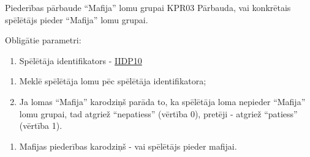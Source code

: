 \procedureTable
{Piederības pārbaude ``Mafija'' lomu grupai}
{KPR03}
{
	Pārbauda, vai konkrētais spēlētājs pieder ``Mafija'' lomu grupai.
}
{
	Obligātie parametri:
	\begin{enumerate}
		\item Spēlētāja identifikators - \hyperref[tab:IIDP10]{IIDP10}
	\end{enumerate}
}
{
	\begin{enumerate}
		\item Meklē spēlētāja lomu pēc spēlētāja identifikatora;
		\item Ja lomas ``Mafija'' karodziņš parāda to, ka spēlētāja loma nepieder ``Mafija'' lomu grupai, tad atgriež ``nepatiess'' (vērtība 0), pretēji - atgriež ``patiess'' (vērtība 1).
	\end{enumerate}
}
{
	\begin{enumerate}
		\item Mafijas piederības karodziņš - vai spēlētājs pieder mafijai.
	\end{enumerate}
}
